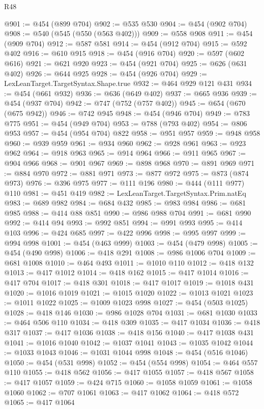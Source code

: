 \begin{lexlean}{R48}
\begin{coremodule}
@901 := @454 (@899 @704)
@902 := @535 @530
@904 := @454 (@902 @704)
@908 := @540 (@545 (@550 (@563 @402)))
@909 := @558 @908
@911 := @454 (@909 @704)
@912 := @587 @581
@914 := @454 (@912 @704)
@915 := @592 @402
@916 := @610 @915
@918 := @454 (@916 @704)
@920 := @597 (@602 @616)
@921 := @621 @920
@923 := @454 (@921 @704)
@925 := @626 (@631 @402)
@926 := @644 @925
@928 := @454 (@926 @704)
@929 := LexLeanTarget.TargetSyntax.Shape.true
@932 := @464 @929 @121 @431
@934 := @454 (@661 @932)
@936 := @636 (@649 @402)
@937 := @665 @936
@939 := @454 (@937 @704)
@942 := @747 (@752 (@757 @402))
@945 := @654 (@670 (@675 @942))
@946 := @742 @945
@948 := @454 (@946 @704)
@949 := @783 @775
@951 := @454 (@949 @704)
@953 := @788 (@793 @402)
@954 := @806 @953
@957 := @454 (@954 @704) @822
@958 := @951 @957
@959 := @948 @958
@960 := @939 @959
@961 := @934 @960
@962 := @928 @961
@963 := @923 @962
@964 := @918 @963
@965 := @914 @964
@966 := @911 @965
@967 := @904 @966
@968 := @901 @967
@969 := @898 @968
@970 := @891 @969
@971 := @884 @970
@972 := @881 @971
@973 := @877 @972
@975 := @873 (@874 @973)
@976 := @396 @975
@977 := @111 @196
@980 := @444 (@111 @977) @110
@981 := @451 @419
@982 := LexLeanTarget.TargetSyntax.Prim.natEq
@983 := @689 @982
@984 := @684 @432
@985 := @983 @984
@986 := @681 @985
@988 := @414 @88 @851
@990 := @986 @988 @704
@991 := @681 @990
@992 := @414 @94
@993 := @992 @851
@994 := @991 @993
@995 := @414 @103
@996 := @424 @685
@997 := @422 @996
@998 := @995 @997
@999 := @994 @998
@1001 := @454 (@463 @999)
@1003 := @454 (@479 @998)
@1005 := @454 (@490 @998)
@1006 := @418 @291
@1008 := @986 @1006 @704
@1009 := @681 @1008
@1010 := @464 @493
@1011 := @1010 @110
@1012 := @418 @132
@1013 := @417 @1012
@1014 := @418 @162
@1015 := @417 @1014
@1016 := @417 @704
@1017 := @418 @301
@1018 := @417 @1017
@1019 := @1018 @431
@1020 := @1016 @1019
@1021 := @1015 @1020
@1022 := @1013 @1021
@1023 := @1011 @1022
@1025 := @1009 @1023 @998
@1027 := @454 (@503 @1025)
@1028 := @418 @146
@1030 := @986 @1028 @704
@1031 := @681 @1030
@1033 := @464 @506 @110
@1034 := @418 @309
@1035 := @417 @1034
@1036 := @418 @317
@1037 := @417 @1036
@1038 := @418 @156
@1040 := @417 @1038 @431
@1041 := @1016 @1040
@1042 := @1037 @1041
@1043 := @1035 @1042
@1044 := @1033 @1043
@1046 := @1031 @1044 @998
@1048 := @454 (@516 @1046)
@1050 := @454 (@531 @998)
@1052 := @454 (@554 @998)
@1054 := @464 @557 @110
@1055 := @418 @562
@1056 := @417 @1055
@1057 := @418 @567
@1058 := @417 @1057
@1059 := @424 @715
@1060 := @1058 @1059
@1061 := @1058 @1060
@1062 := @707 @1061
@1063 := @417 @1062
@1064 := @418 @572
@1065 := @417 @1064

\end{coremodule}
\end{lexlean}
